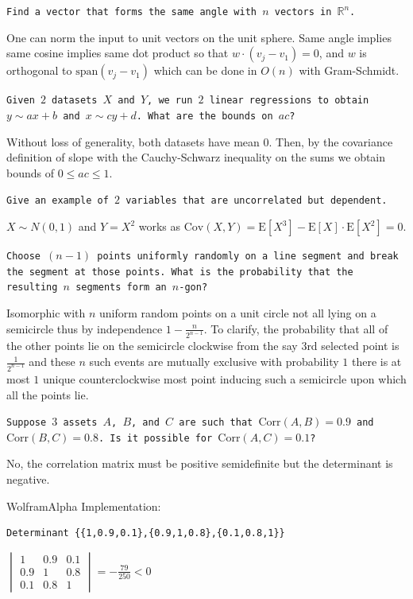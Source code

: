 \texttt{Find a vector that forms the same angle with $n$ vectors in $\mathbb{R}^n$.}

One can norm the input to unit vectors on the unit sphere. Same angle implies same cosine implies same dot product so that $w \cdot (v_j-v_1)=0$, and $w$ is orthogonal to $\text{span}(v_j-v_1)$ which can be done in $O(n)$ with Gram-Schmidt.

\texttt{Given $2$ datasets $X$ and $Y$, we run $2$ linear regressions to obtain $y \sim ax + b$ and $x \sim cy + d$. What are the bounds on $ac$?}

Without loss of generality, both datasets have mean $0$. Then, by the covariance definition of slope with the Cauchy-Schwarz inequality on the sums we obtain bounds of $\boxed{0 \le ac \le 1}$.

\texttt{Give an example of $2$ variables that are uncorrelated but dependent.}

$X \sim N(0,1)$ and $Y=X^2$ works as $\text{Cov}(X,Y)=\text{E}[X^3]-\text{E}[X] \cdot \text{E}[X^2]=\boxed{0}$.

\texttt{Choose $(n-1)$ points uniformly randomly on a line segment and break the segment at those points. What is the probability that the resulting $n$ segments form an $n$-gon?}

Isomorphic with $n$ uniform random points on a unit circle not all lying on a semicircle thus by independence $\boxed{1-\frac{n}{2^{n-1}}}$. To clarify, the probability that all of the other points lie on the semicircle clockwise from the say $3$rd selected point is $\frac{1}{2^{n-1}}$ and these $n$ such events are mutually exclusive with probability $1$ there is at most $1$ unique counterclockwise most point inducing such a semicircle upon which all the points lie.

\texttt{Suppose $3$ assets $A$, $B$, and $C$ are such that $\text{Corr}(A,B)=0.9$ and $\text{Corr}(B,C)=0.8$. Is it possible for $\text{Corr}(A,C)=0.1$?}

$\boxed{\text{No}}$, the correlation matrix must be positive semidefinite but the determinant is negative.

WolframAlpha Implementation:

\begin{verbatim}
Determinant {{1,0.9,0.1},{0.9,1,0.8},{0.1,0.8,1}}
\end{verbatim}

$
\begin{vmatrix}
1 & 0.9 & 0.1 \\
0.9 & 1 & 0.8 \\
0.1 & 0.8 & 1
\end{vmatrix}
=
-\frac{79}{250} < 0
$


